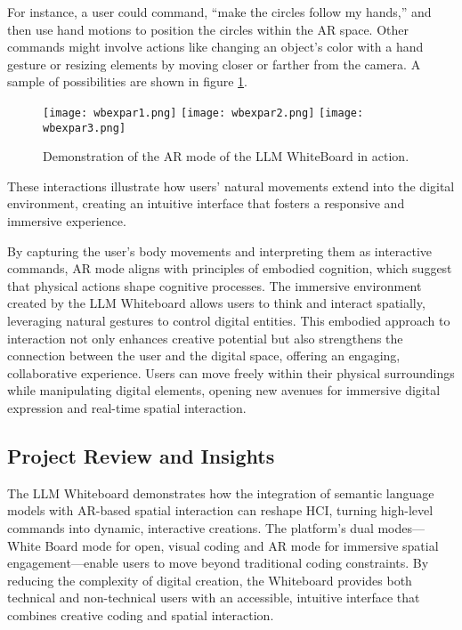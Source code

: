 For instance, a user could command, “make the circles follow my hands,” and then use hand motions to position the circles within the AR space.
Other commands might involve actions like changing an object’s color with a hand gesture or resizing elements by moving closer or farther from the camera.
A sample of possibilities are shown in figure \ref{fig:wbdemo2}.

\begin{figure}[h!]
    \centering
    \texttt{[image: wbexpar1.png]}
    \texttt{[image: wbexpar2.png]}
    \texttt{[image: wbexpar3.png]}
    \caption{Demonstration of the AR mode of the LLM WhiteBoard in action.}
    \vspace{0.1cm}
    \label{fig:wbdemo2}
\end{figure}

These interactions illustrate how users’ natural movements extend into the digital environment, creating an intuitive interface that fosters a responsive and immersive experience.

By capturing the user's body movements and interpreting them as interactive commands, AR mode aligns with principles of embodied cognition, which suggest that physical actions shape cognitive processes.
The immersive environment created by the LLM Whiteboard allows users to think and interact spatially, leveraging natural gestures to control digital entities.
This embodied approach to interaction not only enhances creative potential but also strengthens the connection between the user and the digital space, offering an engaging, collaborative experience.
Users can move freely within their physical surroundings while manipulating digital elements, opening new avenues for immersive digital expression and real-time spatial interaction.


\subsection{Project Review and Insights }

The LLM Whiteboard demonstrates how the integration of semantic language models with AR-based spatial interaction can reshape HCI, turning high-level commands into dynamic, interactive creations.
The platform’s dual modes—White Board mode for open, visual coding and AR mode for immersive spatial engagement—enable users to move beyond traditional coding constraints.
By reducing the complexity of digital creation, the Whiteboard provides both technical and non-technical users with an accessible, intuitive interface that combines creative coding and spatial interaction.

